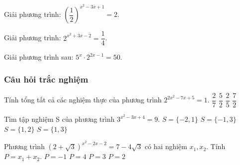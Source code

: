 \begin{vd}%
	Giải phương trình: $\left(\dfrac{1}{2}\right)^{x^2-3x+1}=2$.
\end{vd}

\begin{vd}%
	Giải phương trình: $2^{x^2+3x-2}=\dfrac{1}{4}$.
\end{vd}

\begin{vd}%
	Giải phương trình sau: $5^x\cdot 2^{2x-1}=50$.
\end{vd}

\subsubsection{Câu hỏi trắc nghiệm}
\begin{ex}%
	Tính tổng tất cả các nghiệm thực của phương trình $2^{2x^2-7x+5}=1$. 
	\choice
	{$\dfrac{2}{7}$}
	{$\dfrac{5}{2}$}
	{$\dfrac{2}{5}$}
	{\True $\dfrac{7}{2}$}
\end{ex}

\begin{ex}%
	Tìm tập nghiệm S của phương trình $3^{x^2-3x+4}=9$.
	\choice
	{$S=\{-2,1\}$}
	{$S=\{-1,3\}$}
	{\True $S=\{1,2\}$}
	{$S=\{1,3\}$}
\end{ex}

\begin{ex}%
	Phương trình $(2+\sqrt{3})^{x^2-2x-2}=7-4\sqrt{3}$ có hai nghiệm $x_1,x_2$. Tính $P=x_1+x_2$. 
	\choice
	{$P=-1$}
	{$P=4$}
	{$P=3$}
	{\True $P=2$}
\end{ex}


